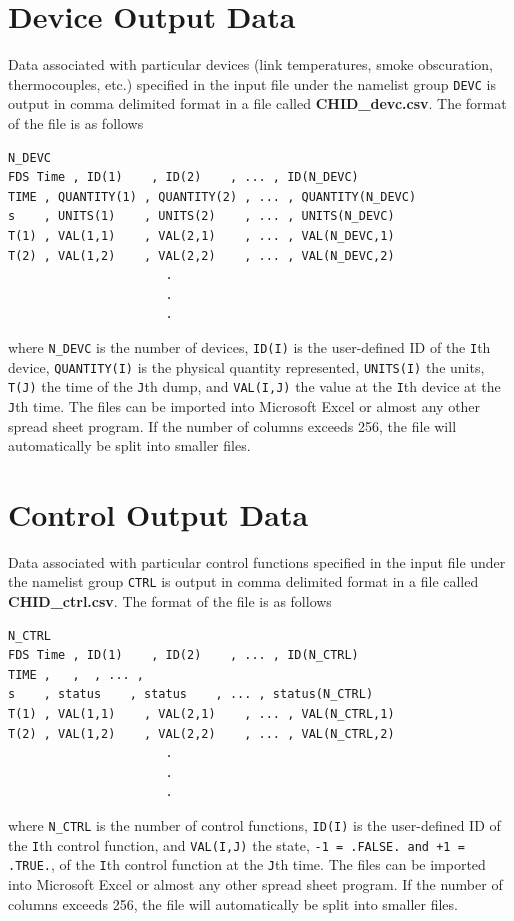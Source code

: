 \documentclass[11pt]{book}
\newcommand{\ct}{\tt\small}
\begin{document}
\section{Device Output Data}
\label{out:DEVC}

Data associated with particular devices (link temperatures, smoke obscuration, thermocouples, etc.)
specified in the input file under the namelist
group {\ct DEVC} is output in comma delimited format in a file called
{\bf CHID\_devc.csv}. The format of the file is as follows

\footnotesize
\begin{verbatim}
N_DEVC
FDS Time , ID(1)    , ID(2)    , ... , ID(N_DEVC)
TIME , QUANTITY(1) , QUANTITY(2) , ... , QUANTITY(N_DEVC)
s    , UNITS(1)    , UNITS(2)    , ... , UNITS(N_DEVC)
T(1) , VAL(1,1)    , VAL(2,1)    , ... , VAL(N_DEVC,1)
T(2) , VAL(1,2)    , VAL(2,2)    , ... , VAL(N_DEVC,2)
                      .
                      .
                      .
\end{verbatim}
\normalsize
where {\ct N\_DEVC} is the number of devices, {\ct ID(I)} is the user-defined
ID of the {\ct I}th device, {\ct QUANTITY(I)} is the physical quantity represented, {\ct UNITS(I)} the
units, {\ct T(J)} the time of the {\ct J}th dump, and
{\ct VAL(I,J)} the value at the {\ct I}th device at the {\ct J}th time.
The files can be imported into Microsoft Excel or almost any other
spread sheet program. If the number of columns exceeds 256, the file will automatically be split into smaller files.

\section{Control Output Data}
\label{out:CTRL}

Data associated with particular control functions specified in the input file under the
namelist group {\ct CTRL} is output in comma delimited format in a file called
{\bf CHID\_ctrl.csv}. The format of the file is as follows

\footnotesize
\begin{verbatim}
N_CTRL
FDS Time , ID(1)    , ID(2)    , ... , ID(N_CTRL)
TIME ,   ,  , ... ,
s    , status    , status    , ... , status(N_CTRL)
T(1) , VAL(1,1)    , VAL(2,1)    , ... , VAL(N_CTRL,1)
T(2) , VAL(1,2)    , VAL(2,2)    , ... , VAL(N_CTRL,2)
                      .
                      .
                      .
\end{verbatim}
\normalsize
where {\ct N\_CTRL} is the number of control functions, {\ct ID(I)} is the user-defined
ID of the {\ct I}th control function, and
{\ct VAL(I,J)} the state, {\ct -1 = .FALSE. and +1 = .TRUE.}, of the {\ct I}th control function at the {\ct J}th time.
The files can be imported into Microsoft Excel or almost any other
spread sheet program. If the number of columns exceeds 256, the file will automatically be split into smaller files.
\end{document}
